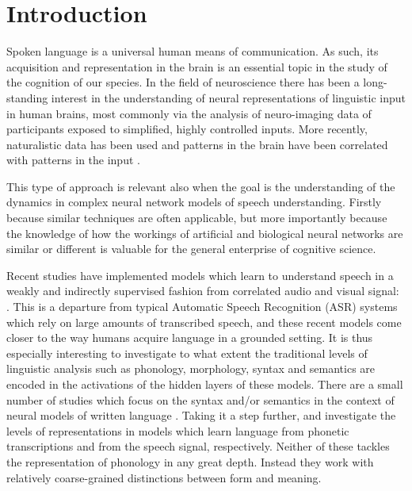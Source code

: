 \section{Introduction}
\label{sec:intro}

Spoken language is a universal human means of communication. As such,
its acquisition and representation in the brain is an
essential topic in the study of the cognition of our species.
In the field of neuroscience there has been a long-standing interest
in the understanding of neural representations of linguistic input in
human brains, most commonly via the analysis of neuro-imaging data of
participants exposed to simplified, highly controlled inputs. More recently, 
naturalistic data has been used and patterns in the brain have been correlated with 
patterns in the input
\citep[e.g.][]{wehbe2014simultaneously,khalighinejad2017dynamic}. 

This type of approach is relevant also when the goal is the understanding
of the dynamics in complex neural network models of speech understanding. 
Firstly because similar techniques are often applicable, but more importantly 
because the knowledge of how the workings of artificial and biological neural
networks are similar or different is valuable for the general enterprise
of cognitive science.

Recent studies have implemented models which learn to understand
speech in a weakly and indirectly supervised fashion from correlated
audio and visual signal:
\citet{harwath2016unsupervised,harwath2017learning,chrupala2017representations}. This
is a departure from typical Automatic Speech Recognition (ASR) systems
which rely on large amounts of transcribed speech, and these recent
models come closer to the way humans acquire language in a grounded
setting. It is thus especially interesting to investigate to what extent the
traditional levels of linguistic analysis such as phonology,
morphology, syntax and semantics are encoded in the activations of
the hidden layers of these models. There are a small number of
studies which focus on the syntax and/or semantics in the context of
neural models of written language
\citep[e.g.][]{elman1991distributed,frank2013acquisition,Kdr2016RepresentationOL,
li2016visualizing,adi2016fine,DBLP:journals/corr/LiMJ16a,TACL972}.
% 
Taking it a step further, \citet{gelderloos2016from} and \citet{chrupala2017representations} 
investigate the levels of representations in models which learn
language from phonetic transcriptions and from the speech signal,
respectively. Neither of these tackles the representation of phonology
in any great depth. Instead they work with relatively coarse-grained
distinctions between form and meaning.

